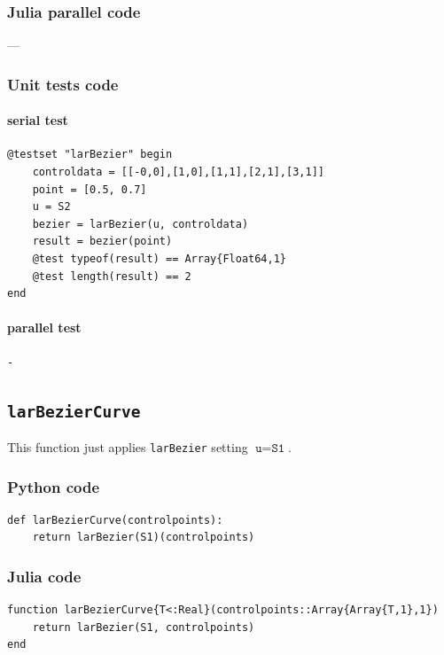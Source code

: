 \documentclass[a4paper,11pt]{article}
\begin{document}
\subsubsection{Julia parallel code}
---

\subsubsection{Unit tests code}

\paragraph{serial test}
\begin{verbatim}
@testset "larBezier" begin
    controldata = [[-0,0],[1,0],[1,1],[2,1],[3,1]]
    point = [0.5, 0.7]
    u = S2
    bezier = larBezier(u, controldata)
    result = bezier(point)
    @test typeof(result) == Array{Float64,1}
    @test length(result) == 2
end
\end{verbatim}

\paragraph{parallel test}
\begin{verbatim}
-
\end{verbatim}


\subsection{\texttt{larBezierCurve}}
This function just applies \texttt{larBezier} setting $\texttt{u} = \texttt{S1}$.

\subsubsection{Python code}

\begin{verbatim}
def larBezierCurve(controlpoints):
    return larBezier(S1)(controlpoints)
\end{verbatim}

\subsubsection{Julia code}

\begin{verbatim}
function larBezierCurve{T<:Real}(controlpoints::Array{Array{T,1},1})
    return larBezier(S1, controlpoints)
end
\end{verbatim}
\end{document}
